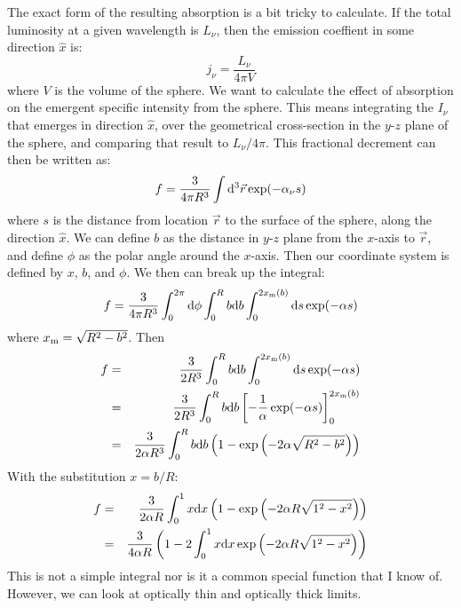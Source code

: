 \documentclass[11pt, preprint]{article}
\begin{document}
\begin{enumerate}
\begin{enumerate}
\begin{answer}
        The exact form of the resulting absorption is a bit tricky to
        calculate. If the total luminosity at a given wavelength is
        $L_\nu$, then the emission coeffient in some direction
        $\hat{x}$ is:
        \begin{equation}
          j_\nu = \frac{L_\nu}{4\pi V}
        \end{equation}
        where $V$ is the volume of the sphere. We want to calculate
        the effect of absorption on the emergent specific intensity
        from the sphere. This means integrating the $I_\nu$ that
        emerges in direction $\hat{x}$, over the geometrical
        cross-section in the $y$-$z$ plane of the sphere, and
        comparing that result to $L_\nu / 4\pi$. This fractional
        decrement can then be written as:
        \begin{equation}
          f = \frac{3}{4\pi R^3} \int {\rm d}^3\vec{r}
          \exp(-\alpha_\nu s)
        \end{equation}
        where $s$ is the distance from location $\vec{r}$ to the
        surface of the sphere, along the direction $\hat{x}$. We can
        define $b$ as the distance in $y$-$z$ plane from the $x$-axis
        to $\vec{r}$, and define $\phi$ as the polar angle around the
        $x$-axis. Then our coordinate system is defined by $x$, $b$,
        and $\phi$. We then can break up the integral:
        \begin{equation}
          f = \frac{3}{4\pi R^3} \int_0^{2\pi} {\rm d}\phi
          \int_0^R b {\rm d}b \int_{0}^{2x_{\rm m}(b)}
              {\rm d}s \exp(-\alpha s)
        \end{equation}
        where $x_{\rm m} = \sqrt{R^2 - b^2}$. Then
        \begin{eqnarray}
          f &=& \frac{3}{2 R^3}
          \int_0^R b {\rm d}b \int_{0}^{2x_{\rm m}(b)}
              {\rm d}s \exp(-\alpha s) \cr
          &=& \frac{3}{2 R^3}
          \int_0^R b {\rm d}b \left[-\frac{1}{\alpha} 
              \exp(-\alpha s)\right]^{2x_{\rm m}(b)}_0 \cr
          &=& \frac{3}{2 \alpha R^3}
          \int_0^R b {\rm d}b \left(1 - 
              \exp\left(-2 \alpha \sqrt{R^2 - b^2}\right)\right)
        \end{eqnarray}
        With the substitution $x= b /R$:
        \begin{eqnarray}
          f
          &=& \frac{3}{2 \alpha R}
          \int_0^1 x {\rm d}x \left(1 - 
              \exp\left(-2 \alpha R \sqrt{1^2 - x^2}\right)\right)\cr
          &=& \frac{3}{4 \alpha R}
          \left(1 - 2 \int_0^1 x {\rm d}x 
              \exp\left(-2 \alpha R \sqrt{1^2 - x^2}\right)\right)
        \end{eqnarray}
        This is not a simple integral nor is it a common special
        function that I know of. However, we can look at optically
        thin and optically thick limits.


\end{answer}
\end{enumerate}
\end{enumerate}
\end{document}
